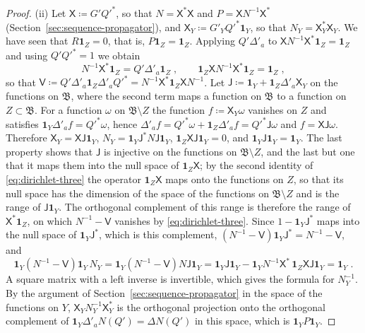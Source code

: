 \documentclass[11pt]{preprint}
\numberwithin{equation}{section}
\theoremstyle{definition}
\theoremstyle{remark}
\theoremstyle{plain}
\begin{document}
\begin{proof}
(ii) Let $\mathsf X \coloneqq G'Q'^*$, so that $N = \mathsf X^*\mathsf X$ and $P = \mathsf XN^{-1}\mathsf X^*$ (Section~\ref{sec:sequence-propagator}), and $\mathsf X_Y \coloneqq G'_YQ'^*\mathbf 1_Y$, so that $N_Y = \mathsf X_Y^*\mathsf X_Y$. We have seen that $R\mathbf 1_Z = 0$, that is, $P\mathbf 1_Z = \mathbf 1_Z$. Applying $Q'\Delta'_a$ to $\mathsf XN^{-1}\mathsf X^*\mathbf 1_Z = \mathbf 1_Z$ and using $Q'Q'^* = 1$ we obtain
\begin{equation}\label{eq:dirichlet-three}
    N^{-1}\mathsf X^*\mathbf 1_Z = Q'\Delta'_a\mathbf 1_Z\;,
    \qquad
    \mathbf 1_Z\mathsf XN^{-1}\mathsf X^*\mathbf 1_Z = \mathbf 1_Z\;,
\end{equation}
so that $\mathsf V \coloneqq Q'\Delta'_a\mathbf 1_Z\Delta'_aQ'^* = N^{-1}\mathsf X^*\mathbf 1_Z\mathsf XN^{-1}$. Let $\mathsf J \coloneqq \mathbf 1_Y + \mathbf 1_Z\Delta'_a\mathsf X_Y$ on the functions on $\mathfrak B$, where the second term maps a function on $\mathfrak B$ to a function on $Z \subset \mathfrak B$. For a function $\omega$ on $\mathfrak B \setminus Z$ the function $f \coloneqq \mathsf X_Y\omega$ vanishes on $Z$ and satisfies $\mathbf 1_Y\Delta'_af = Q'^*\omega$, hence $\Delta'_af = Q'^*\omega + \mathbf 1_Z\Delta'_af = Q'^*\mathsf J\omega$ and $f = \mathsf X\mathsf J\omega$. Therefore $\mathsf X_Y = \mathsf X\mathsf J\mathbf 1_Y$, $N_Y = \mathbf 1_Y\mathsf J^*N\mathsf J\mathbf 1_Y$, $\mathbf 1_Z\mathsf X\mathsf J\mathbf 1_Y = 0$, and $\mathbf 1_Y\mathsf J\mathbf 1_Y = \mathbf 1_Y$. The last property shows that $\mathsf J$ is injective on the functions on $\mathfrak B \setminus Z$, and the last but one that it maps them into the null space of $\mathbf 1_Z\mathsf X$; by the second identity of \eqref{eq:dirichlet-three} the operator $\mathbf 1_Z\mathsf X$ maps onto the functions on $Z$, so that its null space has the dimension of the space of the functions on $\mathfrak B \setminus Z$ and is the range of $\mathsf J\mathbf 1_Y$. The orthogonal complement of this range is therefore the range of $\mathsf X^*\mathbf 1_Z$, on which $N^{-1} - \mathsf V$ vanishes by \eqref{eq:dirichlet-three}. Since $1 - \mathbf 1_Y\mathsf J^*$ maps into the null space of $\mathbf 1_Y\mathsf J^*$, which is this complement, $(N^{-1} - \mathsf V)\mathbf 1_Y\mathsf J^* = N^{-1} - \mathsf V$, and
\begin{equation}\label{eq:dirichlet-inverse}
    \mathbf 1_Y(N^{-1} - \mathsf V)\mathbf 1_Y\,N_Y = \mathbf 1_Y(N^{-1} - \mathsf V)N\mathsf J\mathbf 1_Y = \mathbf 1_Y\mathsf J\mathbf 1_Y - \mathbf 1_YN^{-1}\mathsf X^*\,\mathbf 1_Z\mathsf X\mathsf J\mathbf 1_Y = \mathbf 1_Y\;.
\end{equation}
A square matrix with a left inverse is invertible, which gives the formula for $N_Y^{-1}$. By the argument of Section~\ref{sec:sequence-propagator} in the space of the functions on $Y$, $\mathsf X_YN_Y^{-1}\mathsf X_Y^*$ is the orthogonal projection onto the orthogonal complement of $\mathbf 1_Y\Delta'_aN(Q') = \Delta N(Q')$ in this space, which is $\mathbf 1_YP\mathbf 1_Y$.


\end{proof}
\end{document}
